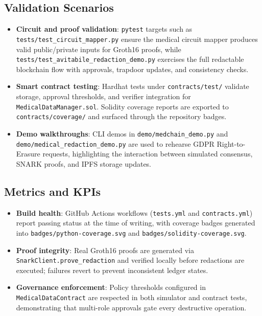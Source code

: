 \subsection{Validation Scenarios}
\begin{itemize}
    \item \textbf{Circuit and proof validation}: \texttt{pytest} targets such as \texttt{tests/test\_circuit\_mapper.py} ensure the medical circuit mapper produces valid public/private inputs for Groth16 proofs, while \texttt{tests/test\_avitabile\_redaction\_demo.py} exercises the full redactable blockchain flow with approvals, trapdoor updates, and consistency checks.
    \item \textbf{Smart contract testing}: Hardhat tests under \texttt{contracts/test/} validate storage, approval thresholds, and verifier integration for \texttt{MedicalDataManager.sol}. Solidity coverage reports are exported to \texttt{contracts/coverage/} and surfaced through the repository badges.
    \item \textbf{Demo walkthroughs}: CLI demos in \texttt{demo/medchain\_demo.py} and \texttt{demo/medical\_redaction\_demo.py} are used to rehearse GDPR Right-to-Erasure requests, highlighting the interaction between simulated consensus, SNARK proofs, and IPFS storage updates.
\end{itemize}

\subsection{Metrics and KPIs}
\begin{itemize}
    \item \textbf{Build health}: GitHub Actions workflows (\texttt{tests.yml} and \texttt{contracts.yml}) report passing status at the time of writing, with coverage badges generated into \texttt{badges/python-coverage.svg} and \texttt{badges/solidity-coverage.svg}.
    \item \textbf{Proof integrity}: Real Groth16 proofs are generated via \texttt{SnarkClient.prove\_redaction} and verified locally before redactions are executed; failures revert to prevent inconsistent ledger states.
    \item \textbf{Governance enforcement}: Policy thresholds configured in \texttt{MedicalDataContract} are respected in both simulator and contract tests, demonstrating that multi-role approvals gate every destructive operation.
\end{itemize}

